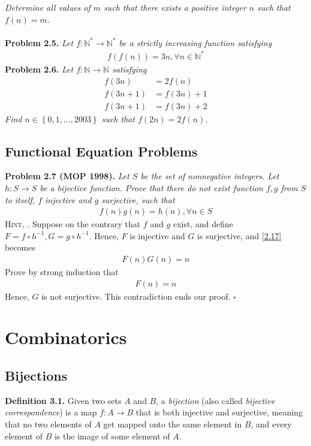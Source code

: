 \documentclass[a4paper,oneside]{article}
\numberwithin{equation}{section}
\begin{document}
\textit{Determine all values of $m$ such that there exists a positive integer $n$ such that $f\left(n\right)=m$.}\\
\\
\textbf{Problem 2.5.} \textit{Let $f:\mathbb{N}^* \to \mathbb{N}^*$ be a strictly increasing function satisfying}
\begin{align}
f\left( {f\left( n \right)} \right) = 3n,\forall n \in {\mathbb{N}^*}
\end{align}
\textbf{Problem 2.6.} \textit{Let $f:\mathbb{N} \to \mathbb{N}$ satisfying}
\begin{align}
f\left( {3n} \right) &= 2f\left( n \right)\\
f\left( {3n + 1} \right) &= f\left( {3n} \right) + 1\\
f\left( {3n + 1} \right) &= f\left( {3n} \right) + 2
\end{align}
\textit{Find $n \in \left\{ {0,1, \ldots ,2003} \right\}$ such that $f\left( {2n} \right) = 2f\left( n \right)$.}
\subsection{Functional Equation Problems}
\textbf{Problem 2.7 (MOP 1998).} \textit{Let $S$ be the set of nonnegative integers. Let $h:S \to S$ be a bijective function. Prove that there do not exist function $f,g$ from $S$ to itself, $f$ injective and $g$ surjective, such that} 
\begin{align}
\label{2.17}
f\left(n\right)g\left(n\right) =h\left(n\right), \forall n \in S
\end{align}
\textsc{Hint, \cite{7}.} Suppose on the contrary that $f$ and $g$ exist, and define $F = f \circ {h^{ - 1}},G = g \circ {h^{ - 1}}$. Hence, $F$ is injective and $G$ is surjective, and \eqref{2.17} becomes
\begin{align}
F\left( n \right)G\left( n \right) = n
\end{align}
Prove by strong induction that 
\begin{align}
F\left(n\right) =n
\end{align}
Hence, $G$ is not surjective. This contradiction ends our proof. \hfill $\square$





\section{Combinatorics}
\subsection{Bijections}
\textbf{Definition 3.1.} Given two sets $A$ and $B$, a \textit{bijection} (also called \textit{bijective correspondence}) is a map $f:A\to B$ that is both injective and surjective, meaning that no two elements of $A$ get mapped onto the same element in $B$, and every element of $B$ is the image of some element of $A$. 
\end{document}
